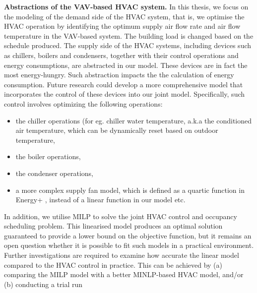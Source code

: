 
\textbf{Abstractions of the VAV-based HVAC system.} In this thesis, we focus on the modeling of the demand side of the HVAC system, that is, we optimise the HVAC operation by identifying the optimum supply air flow rate and air flow temperature in the VAV-based system. The building load is changed based on the schedule produced. The supply side of the HVAC systems, including devices such as chillers, boilers and condensers, together with their control operations and energy consumptions, are abstracted in our model. These devices are in fact the most energy-hungry. Such abstraction impacts the the calculation of energy consumption. Future research could develop a more comprehensive model that incorporates the control of these devices into our joint model. Specifically, such control involves optimizing the following operations:
\begin{itemize}
	\item the chiller operations (for eg. chiller water temperature, a.k.a the conditioned air temperature, which can be dynamically reset based on outdoor temperature, 
	\item the boiler operations,
	\item the condenser operations,
	\item a more complex supply fan model, which is defined as a quartic function in Energy+ \citep{crawley2000energyplus}, instead of a linear function in our model etc.
\end{itemize}
 
In addition, we utilise MILP to solve the joint HVAC control and occupancy scheduling problem. This linearised model produces an optimal solution guaranteed to provide a lower bound on the objective function, but it remains an open question whether it is possible to fit such models in a practical environment. Further investigations are required to examine how accurate the linear model compared to the HVAC control in practice. This can be achieved by (a) comparing the MILP model with a better MINLP-based HVAC model, and/or (b) conducting a trial run 


